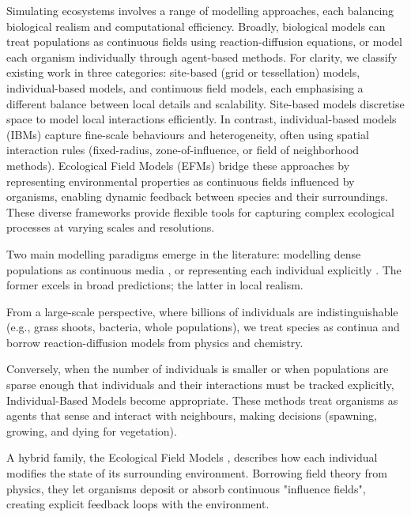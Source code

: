 Simulating ecosystems involves a range of modelling approaches, each balancing biological realism and computational efficiency. Broadly, biological models can treat populations as continuous fields using reaction-diffusion equations, or model each organism individually through agent-based methods. For clarity, we classify existing work in three categories: site-based (grid or tessellation) models, individual-based models, and continuous field models, each emphasising a different balance between local details and scalability. Site-based models discretise space to model local interactions efficiently. In contrast, individual-based models (IBMs) capture fine-scale behaviours and heterogeneity, often using spatial interaction rules (fixed-radius, zone-of-influence, or field of neighborhood methods). Ecological Field Models (EFMs) bridge these approaches by representing environmental properties as continuous fields influenced by organisms, enabling dynamic feedback between species and their surroundings. These diverse frameworks provide flexible tools for capturing complex ecological processes at varying scales and resolutions.


Two main modelling paradigms emerge in the literature: modelling dense populations as continuous media \cite{Turing1952}, or representing each individual explicitly \cite{Czaran1998}. The former excels in broad predictions; the latter in local realism.

From a large-scale perspective, where billions of individuals are indistinguishable (e.g., grass shoots, bacteria, whole populations), we treat species as continua and borrow reaction-diffusion models from physics and chemistry.

Conversely, when the number of individuals is smaller or when populations are sparse enough that individuals and their interactions must be tracked explicitly, Individual-Based Models become appropriate. These methods treat organisms as agents that sense and interact with neighbours, making decisions (spawning, growing, and dying for vegetation).

A hybrid family, the Ecological Field Models \cite{Wu1985}, describes how each individual modifies the state of its surrounding environment. Borrowing field theory from physics, they let organisms deposit or absorb continuous "influence fields", creating explicit feedback loops with the environment.

